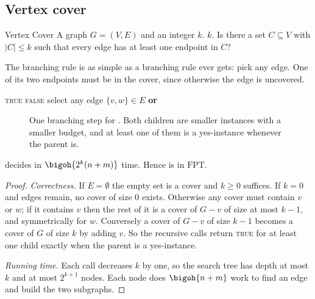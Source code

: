 \subsection{Vertex cover}

\begin{probdef}{Vertex Cover}
  \instance A graph $G = (V,E)$ and an integer $k$.
  \parameter $k$.
  \question Is there a set $C \subseteq V$ with $|C| \le k$ such that every edge
  has at least one endpoint in $C$?
\end{probdef}

The branching rule is as simple as a branching rule ever gets: pick any edge.
One of its two endpoints must be in the cover, since otherwise the edge is
uncovered.

\begin{algorithm}[ht]
\caption{Branching for }
\label{alg:fpt-vc}
\begin{algorithmic}[1]
     \Return \textsc{true} \EndIf
     \Return \textsc{false} \EndIf
    \State select any edge $\{v,w\} \in E$
    \State \Return {} \textbf{ or }
  \EndFunction
\end{algorithmic}
\end{algorithm}

\begin{figure}[ht]
\centering
{}
\caption{One branching step for . Both children are smaller
instances with a smaller budget, and at least one of them is a yes-instance
whenever the parent is.}
\label{fig:fpt-vc-branch}
\end{figure}

\begin{theorem}\label{thm:fpt-vc}
 decides  in $\bigoh{2^k(n+m)}$ time. Hence
 is in $\mathrm{FPT}$.
\end{theorem}

\begin{proof}
\emph{Correctness.} If $E = \emptyset$ the empty set is a cover and $k \ge 0$
suffices. If $k = 0$ and edges remain, no cover of size $0$ exists. Otherwise
any cover must contain $v$ or $w$; if it contains $v$ then the rest of it is a
cover of $G - v$ of size at most $k-1$, and symmetrically for $w$. Conversely a
cover of $G - v$ of size $k-1$ becomes a cover of $G$ of size $k$ by adding $v$.
So the recursive calls return \textsc{true} for at least one child exactly when
the parent is a yes-instance.

\emph{Running time.} Each call decreases $k$ by one, so the search tree has
depth at most $k$ and at most $2^{k+1}$ nodes. Each node does $\bigoh{n+m}$ work
to find an edge and build the two subgraphs.
\end{proof}


